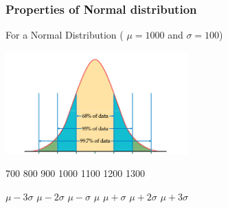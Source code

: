 \documentclass{beamer}\usepackage[]{graphicx}\usepackage[]{color}
\begin{document}
\begin{frame}

\frametitle{Properties of Normal distribution}
 For a Normal Distribution ( $\mu=1000$ and $\sigma=100$)
\begin{center}
\includegraphics[width=7cm,keepaspectratio]{generalnormal6895997.jpeg} 
\end{center}
\begin{center}
\tiny{700 \hspace{0.09 in}  800  \hspace{0.09 in}    900  \hspace{0.09 in}   1000  \hspace{0.06 in}   1100   \hspace{0.06 in}  1200 \hspace{0.06 in}    1300 }
\end{center}

\begin{center}
\tiny{$\mu-3\sigma$ \hspace{0.03 in}  $\mu-2\sigma$  \hspace{0.03 in}    $\mu-\sigma$  \hspace{0.03 in}   $\mu$  \hspace{0.03 in}   $\mu+\sigma$   \hspace{0.03 in}  $\mu+2\sigma$ \hspace{0.03 in}    $\mu+3\sigma$ }


\end{center}
\end{frame}
\end{document}
